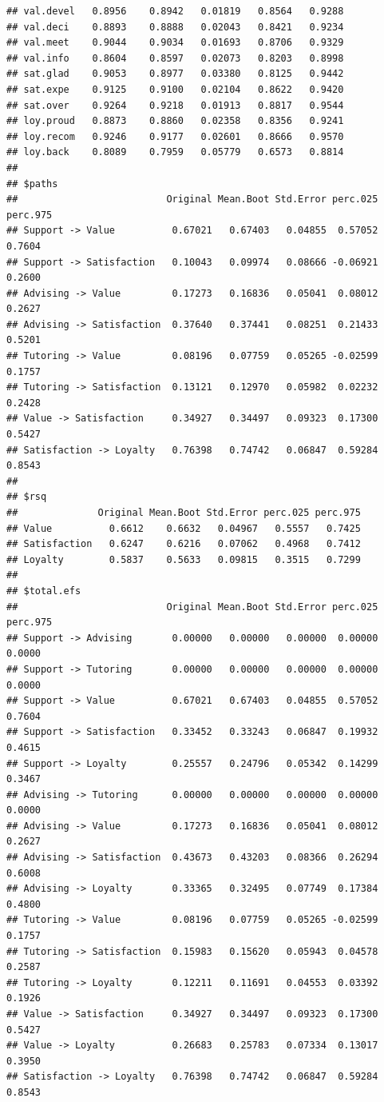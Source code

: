 \documentclass[12pt]{book}\usepackage{graphicx, color}
\makeatletter
\newenvironment{kframe}{%
 \def\at@end@of@kframe{}%
 \ifinner\ifhmode%
  \def\at@end@of@kframe{\end{minipage}}%
  \begin{minipage}{\columnwidth}%
 \fi\fi%
 \def\FrameCommand##1{\hskip\@totalleftmargin \hskip-\fboxsep
 \colorbox{shadecolor}{##1}\hskip-\fboxsep
     \hskip-\linewidth \hskip-\@totalleftmargin \hskip\columnwidth}%
 \MakeFramed {\advance\hsize-\width
   \@totalleftmargin\z@ \linewidth\hsize
   \@setminipage}}%
 {\par\unskip\endMakeFramed%
 \at@end@of@kframe}
\newenvironment{knitrout}{}{} %
\makeatother
\begin{document}
\begin{knitrout}
\begin{kframe}
\begin{verbatim}
## val.devel   0.8956    0.8942   0.01819   0.8564   0.9288
## val.deci    0.8893    0.8888   0.02043   0.8421   0.9234
## val.meet    0.9044    0.9034   0.01693   0.8706   0.9329
## val.info    0.8604    0.8597   0.02073   0.8203   0.8998
## sat.glad    0.9053    0.8977   0.03380   0.8125   0.9442
## sat.expe    0.9125    0.9100   0.02104   0.8622   0.9420
## sat.over    0.9264    0.9218   0.01913   0.8817   0.9544
## loy.proud   0.8873    0.8860   0.02358   0.8356   0.9241
## loy.recom   0.9246    0.9177   0.02601   0.8666   0.9570
## loy.back    0.8089    0.7959   0.05779   0.6573   0.8814
## 
## $paths
##                          Original Mean.Boot Std.Error perc.025 perc.975
## Support -> Value          0.67021   0.67403   0.04855  0.57052   0.7604
## Support -> Satisfaction   0.10043   0.09974   0.08666 -0.06921   0.2600
## Advising -> Value         0.17273   0.16836   0.05041  0.08012   0.2627
## Advising -> Satisfaction  0.37640   0.37441   0.08251  0.21433   0.5201
## Tutoring -> Value         0.08196   0.07759   0.05265 -0.02599   0.1757
## Tutoring -> Satisfaction  0.13121   0.12970   0.05982  0.02232   0.2428
## Value -> Satisfaction     0.34927   0.34497   0.09323  0.17300   0.5427
## Satisfaction -> Loyalty   0.76398   0.74742   0.06847  0.59284   0.8543
## 
## $rsq
##              Original Mean.Boot Std.Error perc.025 perc.975
## Value          0.6612    0.6632   0.04967   0.5557   0.7425
## Satisfaction   0.6247    0.6216   0.07062   0.4968   0.7412
## Loyalty        0.5837    0.5633   0.09815   0.3515   0.7299
## 
## $total.efs
##                          Original Mean.Boot Std.Error perc.025 perc.975
## Support -> Advising       0.00000   0.00000   0.00000  0.00000   0.0000
## Support -> Tutoring       0.00000   0.00000   0.00000  0.00000   0.0000
## Support -> Value          0.67021   0.67403   0.04855  0.57052   0.7604
## Support -> Satisfaction   0.33452   0.33243   0.06847  0.19932   0.4615
## Support -> Loyalty        0.25557   0.24796   0.05342  0.14299   0.3467
## Advising -> Tutoring      0.00000   0.00000   0.00000  0.00000   0.0000
## Advising -> Value         0.17273   0.16836   0.05041  0.08012   0.2627
## Advising -> Satisfaction  0.43673   0.43203   0.08366  0.26294   0.6008
## Advising -> Loyalty       0.33365   0.32495   0.07749  0.17384   0.4800
## Tutoring -> Value         0.08196   0.07759   0.05265 -0.02599   0.1757
## Tutoring -> Satisfaction  0.15983   0.15620   0.05943  0.04578   0.2587
## Tutoring -> Loyalty       0.12211   0.11691   0.04553  0.03392   0.1926
## Value -> Satisfaction     0.34927   0.34497   0.09323  0.17300   0.5427
## Value -> Loyalty          0.26683   0.25783   0.07334  0.13017   0.3950
## Satisfaction -> Loyalty   0.76398   0.74742   0.06847  0.59284   0.8543
\end{verbatim}
\end{kframe}
\end{knitrout}
\end{document}
